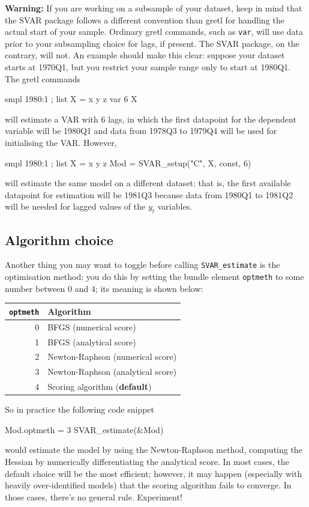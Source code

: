 \documentclass[a4paper,10pt]{article}
\newcommand{\app}[1]{\textsf{#1}}
\newcommand{\cmd}[1]{\texttt{#1}}
\begin{document}
\textbf {Warning:} If you are working on a subsample of your dataset,
keep in mind that the SVAR package follows a different convention than
\app{gretl} for handling the actual start of your sample. Ordinary
\app{gretl} commands, such as \cmd{var}, will use data prior to your
subsampling choice for lags, if present. The SVAR package, on the
contrary, will not. An example should make this clear: suppose your
dataset starts at 1970Q1, but you restrict your sample range only to
start at 1980Q1. The \app{gretl} commands
\begin{code}
  smpl 1980:1 ;
  list X = x y z
  var 6 X
\end{code}
will estimate a VAR with 6 lags, in which the first datapoint for the
dependent variable will be 1980Q1 and data from 1978Q3 to 1979Q4 will
be used for initialising the VAR. However,
\begin{code}
  smpl 1980:1 ;
  list X = x y z
  Mod = SVAR_setup("C", X, const, 6)
\end{code}
will estimate the same model on a different dataset: that is, the first
available datapoint for estimation will be 1981Q3 because data from
1980Q1 to 1981Q2 will be needed for lagged values of the $y_t$ variables.

\subsection{Algorithm choice}
\label{sec:algorithms}

Another thing you may want to toggle before calling
\texttt{SVAR\_estimate} is the optimisation method: you do this by
setting the bundle element \texttt{optmeth} to some number between 0
and 4; its meaning is shown below:

\begin{center}
  \begin{tabular}{rl}
    \hline
    \texttt{optmeth} & Algorithm \\
    \hline
	0 & BFGS (numerical score) \\
	1 & BFGS (analytical score) \\
	2 & Newton-Raphson (numerical score) \\
	3 & Newton-Raphson (analytical score) \\
	4 & Scoring algorithm (\textbf{default}) \\
    \hline
  \end{tabular}
\end{center}

So in practice the following code snippet
\begin{code}
  Mod.optmeth = 3
  SVAR_estimate(&Mod)
\end{code}
would estimate the model by using the Newton-Raphson method, computing
the Hessian by numerically differentiating the analytical score. In
most cases, the default choice will be the most efficient; however, it
may happen (especially with heavily over-identified models) that the
scoring algorithm fails to converge. In those cases, there's no
general rule. Experiment!
\end{document}
